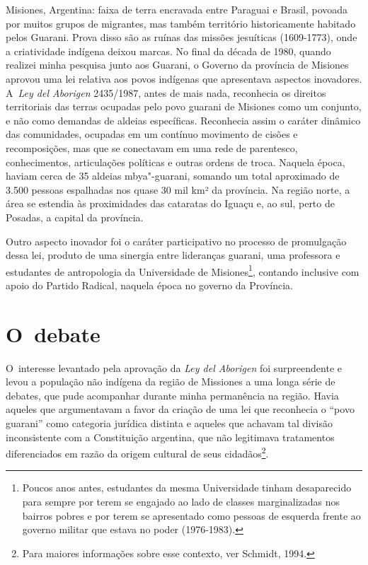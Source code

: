 Misiones, Argentina: faixa de terra encravada entre Paraguai e Brasil,
povoada por muitos grupos de migrantes, mas também território
historicamente habitado pelos Guarani. Prova disso são as ruínas das
missões jesuíticas (1609-1773), onde a criatividade indígena deixou
marcas. No final da década de 1980, quando realizei minha pesquisa
junto aos Guarani, o Governo da província de Misiones aprovou uma lei
relativa aos povos indígenas que apresentava aspectos inovadores. A~\emph{Ley
del Aborigen} 2435/1987, antes de mais nada, reconhecia os direitos
territoriais das terras ocupadas pelo povo guarani de Misiones como um
conjunto, e não como demandas de aldeias específicas. Reconhecia assim
o caráter dinâmico das comunidades, ocupadas em um contínuo movimento
de cisões e recomposições, mas que se conectavam em uma rede de
parentesco, conhecimentos, articulações políticas e outras ordens de
troca. Naquela época, haviam cerca de 35 aldeias mbya"-guarani, somando
um total aproximado de 3.500 pessoas espalhadas nos quase 30 mil km² da
província. Na região norte, a área se estendia às proximidades das
cataratas do Iguaçu e, ao sul, perto de Posadas, a capital da
província.

Outro aspecto inovador foi o caráter participativo no processo de
promulgação dessa lei, produto de uma sinergia entre lideranças
guarani, uma professora e estudantes de antropologia da Universidade de
Misiones\footnote{Poucos anos antes, estudantes da mesma Universidade
tinham desaparecido para sempre por terem se engajado ao lado de
classes marginalizadas nos bairros pobres e por terem se apresentado
como pessoas de esquerda frente ao governo militar que estava no poder
(1976-1983).}, contando inclusive com apoio do Partido Radical, naquela
época no governo da Província. 

\section{O~debate}

O~interesse levantado pela aprovação da \emph{Ley del Aborigen} foi
surpreendente e levou a população não indígena da região de Missiones a
uma longa série de debates, que pude acompanhar durante minha
permanência na região. Havia aqueles que argumentavam a favor da
criação de uma lei que reconhecia o ``povo guarani'' como categoria
jurídica distinta e aqueles que achavam tal divisão inconsistente com a
Constituição argentina, que não legitimava tratamentos diferenciados em
razão da origem cultural de seus cidadãos\footnote{Para maiores
informações sobre esse contexto, ver Schmidt, 1994.}. 

